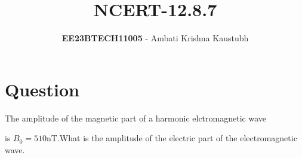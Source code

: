 \documentclass[journal,12pt,twocolumn]{IEEEtran}
\theoremstyle{remark}
\begin{document}
 

\title{NCERT-12.8.7}
\author{\textbf{EE23BTECH11005} - Ambati Krishna Kaustubh%
}
\maketitle
\newpage
\bigskip

\renewcommand{\thefigure}{\arabic{figure}}
\renewcommand{\thetable}{\arabic{table}}
\section*{Question}

The amplitude  of the magnetic part of a harmonic elctromagnetic wave

 is $B_0=510$nT.What is the amplitude of the electric part of the electromagnetic wave. 
   
\solution
\end{document}
